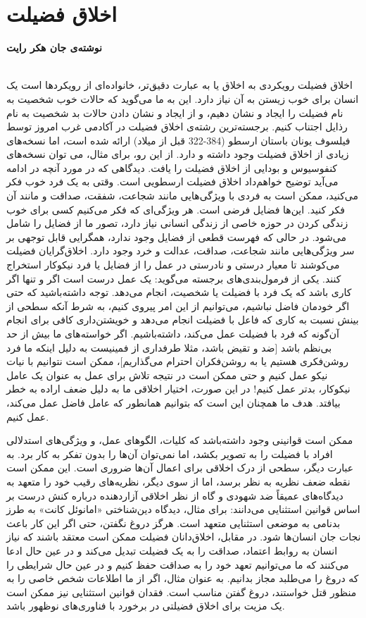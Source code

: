 {
\section*{اخلاق فضیلت}
\label{sec:اخلاق فضیلت}
\textbf{نوشته‌ی جان هکر رایت}
\\\\
}
اخلاق فضیلت رویکردی به اخلاق یا به عبارت دقیق‌تر، خانواده‌ای از رویکردها است یک انسان برای خوب زیستن به آن نیاز دارد.
این به ما می‌گوید که حالات خوب شخصیت به نام فضیلت را ایجاد و نشان دهیم، و از ایجاد و نشان دادن حالات بد شخصیت به نام رذایل اجتناب کنیم.
برجسته‌ترین رشته‌ی اخلاق فضیلت در آکادمی غرب امروز توسط فیلسوف یونان باستان ارسطو (384-322 قبل از میلاد) ارائه شده است، اما نسخه‌های زیادی از اخلاق فضیلت وجود داشته و دارد.
از این رو، برای مثال، می توان نسخه‌های کنفوسیوس و بودایی از اخلاق فضیلت را یافت.
دیدگاهی که در مورد آنچه در ادامه می‌آید توضیح خواهم‌داد اخلاق فضیلت ارسطویی است.
وقتی به یک فرد خوب فکر می‌کنید، ممکن است به فردی با ویژگی‌هایی مانند شجاعت، شفقت، صداقت و مانند آن فکر کنید.
این‌ها فضایل فرضی است.
هر ویژگی‌ای که فکر می‌کنیم کسی برای خوب زندگی کردن در حوزه خاصی از زندگی انسانی نیاز دارد، تصور ما از فضایل را شامل می‌شود.
در حالی که فهرست قطعی از فضایل وجود ندارد، همگرایی قابل توجهی بر سر ویژگی‌هایی مانند شجاعت، صداقت، عدالت و خرد وجود دارد.
اخلاق‌گرایان فضیلت می‌کوشند تا معیار درستی و نادرستی در عمل را از فضایل یا فرد نیکوکار استخراج کنند.
یکی از فرمول‌بندی‌های برجسته می‌گوید: یک عمل درست است اگر و تنها اگر کاری باشد که یک فرد با فضیلت یا شخصیت، انجام می‌دهد.
توجه داشته‌باشید که حتی اگر خودمان فاضل نباشیم، می‌توانیم از این امر پیروی کنیم، به شرط آنکه سطحی از بینش نسبت به کاری که فاعل با فضیلت انجام می‌دهد و خویشتن‌داری کافی برای انجام آن‌گونه که فرد با فضیلت عمل می‌کند، داشته‌باشیم.
اگر خواسته‌های ما بیش از حد بی‌نظم باشد [ضد و تقیض باشد، مثلا طرفداری از فمینیست به دلیل اینکه ما فرد روشن‌فکری هستیم یا به روشن‌فکران احترام می‌گذاریم]، ممکن است نتوانیم با نیات نیکو عمل کنیم و حتی ممکن است در نتیجه تلاش برای عمل به عنوان یک عامل نیکوکار، بدتر عمل کنیم!
در این صورت، اختیار اخلاقی ما به دلیل ضعف اراده به خطر بیافتد.
هدف ما همچنان این است که بتوانیم همانطور که عامل فاضل عمل می‌کند، عمل کنیم.

ممکن است قوانینی وجود داشته‌باشد که کلیات، الگوهای عمل، و ویژگی‌های استدلالی افراد با فضیلت را به تصویر بکشد، اما نمی‌توان آن‌ها را بدون تفکر به کار برد.
به عبارت دیگر، سطحی از درک اخلاقی برای اعمال آن‌ها ضروری است.
این ممکن است نقطه ضعف نظریه به نظر برسد، اما از سوی دیگر، نظریه‌های رقیب خود را متعهد به دیدگاه‌های عمیقاً ضد شهودی و گاه از نظر اخلاقی آزاردهنده درباره کنش درست بر اساس قوانین استثنایی می‌دانند: برای مثال، دیدگاه دین‌شناختی «امانوئل کانت» به طرز بدنامی به موضعی استثنایی متعهد است.
هرگز دروغ نگفتن، حتی اگر این کار باعث نجات جان انسان‌ها شود.
در مقابل، اخلاق‌دانان فضیلت ممکن است معتقد باشند که نیاز انسان به روابط اعتماد، صداقت را به یک فضیلت تبدیل می‌کند و در عین حال ادعا می‌کنند که ما می‌توانیم تعهد خود را به صداقت حفظ کنیم و در عین حال شرایطی را که دروغ را می‌طلبد مجاز بدانیم.
به عنوان مثال، اگر از ما اطلاعات شخص خاصی را به منظور قتل خواستند، دروغ گفتن مناسب است.
فقدان قوانین استثنایی نیز ممکن است یک مزیت برای اخلاق فضیلتی در برخورد با فناوری‌های نوظهور باشد.

